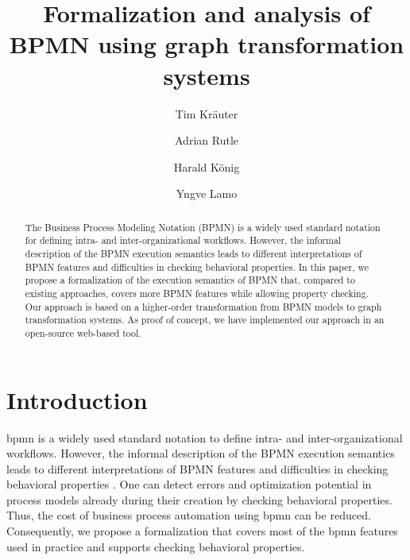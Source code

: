 \documentclass[runningheads]{llncs}
\begin{document}
%
\title{Formalization and analysis of BPMN using graph transformation systems}
%
%
\author{Tim Kr\"{a}uter \and
Adrian Rutle \and
Harald K\"{o}nig \and
Yngve Lamo}
%
%
%
\maketitle              %
%
\begin{abstract}
The Business Process Modeling Notation (BPMN) is a widely used standard notation for defining intra- and inter-organizational workflows.
However, the informal description of the BPMN execution semantics leads to different interpretations of BPMN features and difficulties in checking behavioral properties.
In this paper, we propose a formalization of the execution semantics of BPMN that, compared to existing approaches, covers more BPMN features while allowing property checking.
Our approach is based on a higher-order transformation from BPMN models to graph transformation systems.
As proof of concept, we have implemented our approach in an open-source web-based tool.

\end{abstract}


\section{Introduction}
\gls*{bpmn} \cite{objectmanagementgroupBusinessProcessModel2013} is a widely used standard notation to define intra- and inter-organizational workflows.
However, the informal description of the BPMN execution semantics leads to different interpretations of BPMN features and difficulties in checking behavioral properties \cite{corradiniFormalApproachAnalysis2021}.
One can detect errors and optimization potential in process models already during their creation by checking behavioral properties.
Thus, the cost of business process automation using \gls*{bpmn} can be reduced.
Consequently, we propose a formalization that covers most of the \gls*{bpmn} features used in practice and supports checking behavioral properties.
\end{document}
